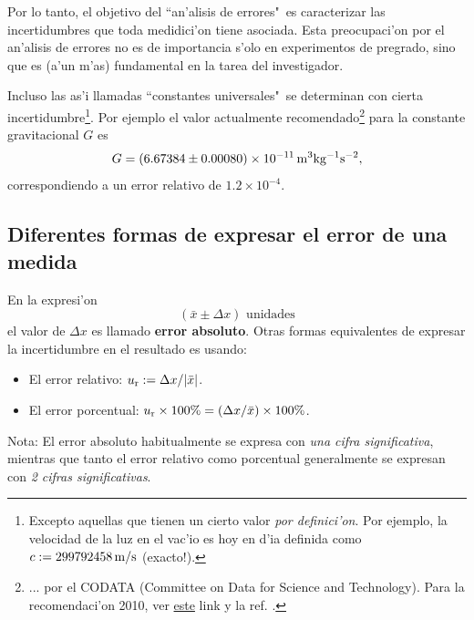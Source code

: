 \documentclass[letterpaper,11pt]{report}
\begin{document}
Por lo tanto, el objetivo del ``an'alisis de errores"\, es caracterizar las incertidumbres que toda medidici'on tiene asociada. Esta preocupaci'on por el an'alisis de errores no es de importancia s'olo en experimentos de pregrado, sino que es (a'un m'as) fundamental en la tarea del investigador.

Incluso las as'i llamadas ``constantes universales"\ se determinan con cierta incertidumbre\footnote{Excepto aquellas que tienen un cierto valor \textit{por definici'on}. Por ejemplo, la velocidad de la luz en el vac'io es hoy en d'ia definida como $c:=299792458\,{\rm m/s}$ (exacto!).}. Por ejemplo el valor actualmente recomendado\footnote{... por el CODATA (Committee on Data for Science and Technology). Para la recomendaci'on 2010, ver \href{http://www.codata.org/committees-and-groups/fundamental-physical-constants/tgfc-previous-values-and-publications}{este} link y la ref. \cite{CODATA2010}.} para la constante gravitacional $G$ es 
\begin{equation}\label{G}
G=(6.67384\pm 0.00080)\times 10^{-11}\,{\rm m^3kg^{-1}s^{-2}} ,
\end{equation}
correspondiendo a un error relativo de $1.2\times 10^{-4}$.

\subsection{Diferentes formas de expresar el error de una medida}

En la expresi'on
\begin{equation}
(\bar{x}\pm\Delta x) \text{ unidades}
\end{equation}
el valor de $\Delta x$ es llamado \textbf{error absoluto}. Otras formas equivalentes de expresar la incertidumbre en el resultado es usando:
\begin{itemize}
\item El error relativo:  $u_{\rm r}:=\Delta x/|\bar{x}|$.
\item El error porcentual:  $u_{\rm r}\times 100\% = (\Delta x/\bar{x})\times 100\%$.
\end{itemize}

Nota: El error absoluto habitualmente se expresa con \textit{una cifra significativa}, mientras que tanto el error relativo como porcentual generalmente se expresan con \textit{2 cifras significativas}.
\end{document}
